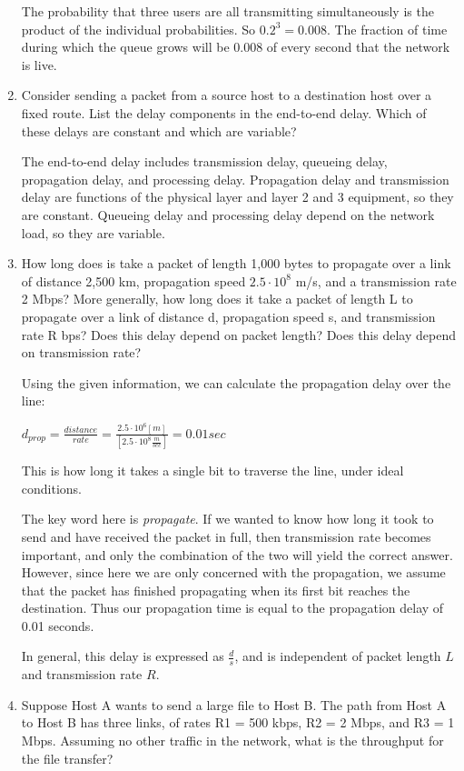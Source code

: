 \documentclass[10pt]{article}
\begin{document}
\begin{enumerate}
    The probability that three users are all transmitting simultaneously is the product of the individual probabilities.  So $0.2^3=0.008$.  The fraction of time during which the queue grows will be 0.008 of every second that the network is live.
    
    \item Consider sending a packet from a source host to a destination host over a fixed route. List the delay components in the end-to-end delay. Which of these delays are constant and which are variable?
    
    The end-to-end delay includes transmission delay, queueing delay, propagation delay, and processing delay.  Propagation delay and transmission delay are functions of the physical layer and layer 2 and 3 equipment, so they are constant.  Queueing delay and processing delay depend on the network load, so they are variable.
    
    \item How long does is take a packet of length 1,000 bytes to propagate over a link of distance 2,500 km, propagation speed $2.5\cdot 10^8$ m/s, and a transmission rate 2 Mbps? More generally, how long does it take a packet of length L to propagate over a link of distance d, propagation speed s, and transmission rate R bps? Does this delay depend on packet length? Does this delay depend on transmission rate?
    
    Using the given information, we can calculate the propagation delay over the line:
    
    $d_{prop} = \frac{distance}{rate} = \frac{2.5\cdot 10^6[m]}{[2.5\cdot 10^8\frac{m}{sec}]} = 0.01 sec$
    
    This is how long it takes a single bit to traverse the line, under ideal conditions.
    
    The key word here is \emph{propagate}.  If we wanted to know how long it took to send and have received the packet in full, then transmission rate becomes important, and only the combination of the two will yield the correct answer.  However, since here we are only concerned with the propagation, we assume that the packet has finished propagating when its first bit reaches the destination.  Thus our propagation time is equal to the propagation delay of 0.01 seconds.
    
    In general, this delay is expressed as $\frac{d}{s}$, and is independent of packet length $L$ and transmission rate $R$.
    
    \item Suppose Host A wants to send a large file to Host B. The path from Host A to Host B has three links, of rates R1 = 500 kbps, R2 = 2 Mbps, and R3 = 1 Mbps. Assuming no other traffic in the network, what is the throughput for the file transfer?


\end{enumerate}
\end{document}
